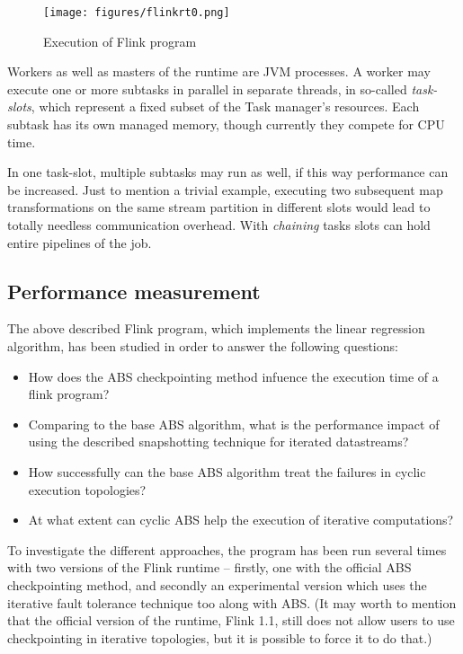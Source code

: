 \begin{figure}[!ht]
  \centering    
      \texttt{[image: figures/flinkrt0.png]}
  \caption{Execution of Flink program\cite{flink_concepts}}
  \label{fig:flinkrt}
\end{figure}  

Workers as well as masters of the runtime are JVM processes. A worker may execute one or more subtasks in parallel in separate threads, in so-called \textit{task-slots}, which represent a fixed subset of the Task manager's resources. Each subtask has its own managed memory, though currently they compete for CPU time.

In one task-slot, multiple subtasks may run as well, if this way performance can be increased. Just to mention a trivial example, executing two subsequent map transformations on the same stream partition in different slots would lead to totally  needless communication overhead. With \textit{chaining} tasks slots can hold entire pipelines of the job. 



\subsection{Performance measurement}

The above described Flink program, which implements the linear regression algorithm, has been studied in order to answer the following questions:
\begin{itemize}
\item How does the ABS checkpointing method infuence the execution time of a flink program?
\item Comparing to the base ABS algorithm, what is the performance impact of using the described snapshotting technique for iterated datastreams?
\item How successfully can the base ABS algorithm treat the failures in cyclic execution topologies?
\item At what extent can cyclic ABS help the execution of iterative computations?
\end{itemize}
To investigate the different approaches, the program has been run several times with two versions of the Flink runtime -- firstly, one with the official ABS checkpointing method, and secondly an experimental version which uses the iterative fault tolerance technique too along with ABS. (It may worth to mention that the official version of the runtime, Flink 1.1, still does not allow users to use checkpointing in iterative topologies, but it is possible to force it to do that.)
 
